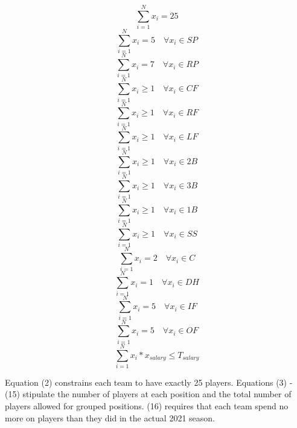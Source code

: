 \documentclass{article}
\begin{document}
\begin{equation}
\sum_{i = 1}^{N} x_{i} = 25
\end{equation}
\begin{equation}
\sum_{i = 1}^{N} x_{i} = 5 \quad \forall x_i \in SP
\end{equation}
\begin{equation}
\sum_{i = 1}^{N} x_{i} = 7 \quad \forall x_i \in RP
\end{equation}
\begin{equation} 
\sum_{i = 1}^{N} x_{i} \geq 1 \quad \forall x_i \in CF
\end{equation}
\begin{equation} 
\sum_{i = 1}^{N} x_{i} \geq 1 \quad \forall x_i \in RF
\end{equation}
\begin{equation} 
\sum_{i = 1}^{N} x_{i} \geq 1 \quad \forall x_i \in LF
\end{equation}
\begin{equation} 
\sum_{i = 1}^{N} x_{i} \geq 1 \quad \forall x_i \in 2B
\end{equation}
\begin{equation} 
\sum_{i = 1}^{N} x_{i} \geq 1 \quad \forall x_i \in 3B
\end{equation} 
\begin{equation} 
\sum_{i = 1}^{N} x_{i} \geq 1 \quad \forall x_i \in 1B
\end{equation}
\begin{equation} 
\sum_{i = 1}^{N} x_{i} \geq 1 \quad \forall x_i \in SS
\end{equation}
\begin{equation} 
\sum_{i = 1}^{N} x_{i} = 2 \quad \forall x_i \in C
\end{equation}
\begin{equation}
\sum_{i = 1}^{N} x_{i} = 1 \quad \forall x_i \in DH
\end{equation}
\begin{equation} 
\sum_{i = 1}^{N} x_{i} = 5 \quad \forall x_i \in IF
\end{equation}
\begin{equation} 
\sum_{i = 1}^{N} x_{i}  = 5 \quad \forall x_i \in OF 
\end{equation}
\begin{equation}
\sum_{i = 1}^{N} x_{i} * x_{salary} \leq T_{salary}
\end{equation}

Equation (2) constrains each team to have exactly 25 players. Equations (3) - (15) stipulate the number of players at each position and the total number of players allowed for grouped positions.   (16) requires that each team spend no more on players than they did in the actual 2021 season. 
\end{document}
